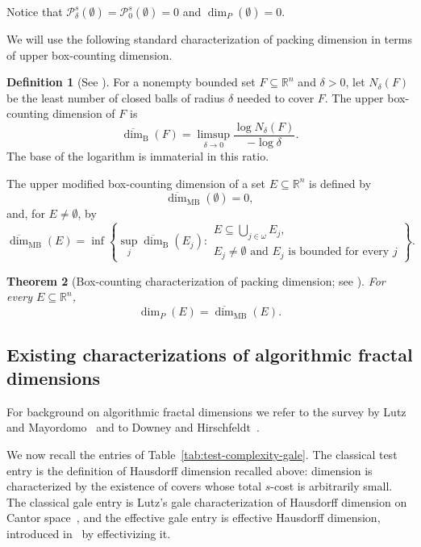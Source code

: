 \documentclass[a4paper,oneside,reqno,12pt]{amsart}
\theoremstyle{plain}
\newtheorem{theorem}{Theorem}[section]
\theoremstyle{definition}
\newtheorem{definition}[theorem]{Definition}
\theoremstyle{remark}
\begin{document}
Notice that \(\mathcal{P}^s_\delta(\emptyset)=\mathcal{P}^s_0(\emptyset)=0\)
and \(\dim_P(\emptyset)=0\).

We will use the following standard characterization of packing dimension
in terms of upper box-counting dimension.

\begin{definition}[{See \cite[Subsections~2.1 and~2.3]{Falconer2014}}]
\label{def:box-counting-dimensions}
For a nonempty bounded set \(F\subseteq\mathbb R^n\) and \(\delta>0\), let
\(N_\delta(F)\) be the least number of closed balls of radius \(\delta\)
needed to cover \(F\).  The upper box-counting dimension of \(F\) is
\[
\overline{\dim}_{\mathrm B}(F)
=
\limsup_{\delta\to0}
\frac{\log N_\delta(F)}{-\log\delta}.
\]
The base of the logarithm is immaterial in this ratio.

The upper modified box-counting dimension of a set
\(E\subseteq\mathbb R^n\) is defined by
\[
\overline{\dim}_{\mathrm{MB}}(\emptyset)=0,
\]
and, for \(E\ne\emptyset\), by
\[
\overline{\dim}_{\mathrm{MB}}(E)
=
\inf
\left\{
\sup_j \overline{\dim}_{\mathrm B}(E_j):
\begin{array}{l}
E\subseteq\bigcup_{j\in\omega} E_j,\\
E_j\ne\emptyset\text{ and }E_j\text{ is bounded for every }j
\end{array}
\right\}.
\]
\end{definition}

\begin{theorem}[{Box-counting characterization of packing dimension; see \cite[Proposition~3.9]{Falconer2014}}]
\label{thm:packing-modified-box-counting}
For every \(E\subseteq\mathbb R^n\),
\[
\dim_P(E)=\overline{\dim}_{\mathrm{MB}}(E).
\]
\end{theorem}

\subsection{Existing characterizations of algorithmic fractal dimensions}
\label{subsec:existing-characterizations}

For background on algorithmic fractal dimensions we refer to the survey by
Lutz and Mayordomo~\cite{LutzMayordomo2021} and to Downey and
Hirschfeldt~\cite[Chapter~13]{DowneyHirschfeldt2010}.  
 
We now recall the entries of Table~\ref{tab:test-complexity-gale}.  The
classical test entry is the definition of Hausdorff dimension recalled above:
dimension is characterized by the existence of covers whose total \(s\)-cost
is arbitrarily small.  The classical gale entry is Lutz's gale
characterization of Hausdorff dimension on Cantor
space~\cite[Theorem~3.6]{Lutz2003}, and the effective gale entry is effective
Hausdorff dimension, introduced in~\cite{Lutz2003b} by effectivizing it.
\end{document}
